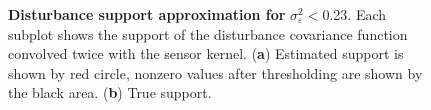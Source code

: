 \documentclass[]{article}
\begin{document}
\begin{figure}[!ht]
\begin{center}
\end{center}
\caption{{\bf Disturbance support approximation for }$\sigma_{\varepsilon}^2<$0.23. Each subplot shows the support of the disturbance covariance function convolved twice with the sensor kernel. (\textbf{a}) Estimated support is shown by red circle, nonzero values after thresholding are shown by the black area. (\textbf{b}) True support.}
\label{fig:BinaryDisturbanceWidthEstimation}
\end{figure}
\end{document}
